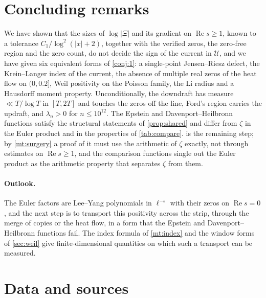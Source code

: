 \documentclass[11pt]{article}
\theoremstyle{definition}\newtheorem{definition}[theorem]{Definition}
\theoremstyle{remark}\newtheorem{remark}[theorem]{Remark}
\renewcommand{\Re}{\operatorname{Re}}\renewcommand{\Im}{\operatorname{Im}}
\begin{document}
\section{Concluding remarks}\label{sec:concl}
We have shown that the sizes of $\log|\Xi|$ and its gradient on $\Re s\ge1$, known to a tolerance $C_1/\log^2(|x|+2)$, together with the verified zeros, the zero-free region and the zero count, do not decide the sign of the current in $\mathcal U$, and we have given six equivalent forms of \cref{conj:1}: a single-point Jensen--Riesz defect, the Krein--Langer index of the current, the absence of multiple real zeros of the heat flow on $(0,0.2]$, Weil positivity on the Poisson family, the Li radius and a Hausdorff moment property. Unconditionally, the downdraft has measure $\ll T/\log T$ in $[T,2T]$ and touches the zeros off the line, Ford's region carries the updraft, and $\lambda_n>0$ for $n\le10^{12}$. The Epstein and Davenport--Heilbronn functions satisfy the structural statements of \cref{prop:shared} and differ from $\zeta$ in the Euler product and in the properties of \cref{tab:compare}.  is the remaining step; by \cref{mt:surgery} a proof of it must use the arithmetic of $\zeta$ exactly, not through estimates on $\Re s\ge1$, and the comparison functions single out the Euler product as the arithmetic property that separates $\zeta$ from them.

\paragraph{Outlook.} The Euler factors are Lee--Yang polynomials in $\ell^{-s}$ with their zeros on $\Re s=0$, and the next step is to transport this positivity across the strip, through the merge of copies or the heat flow, in a form that the Epstein and Davenport--Heilbronn functions fail. The index formula of \cref{mt:index} and the window forms of \cref{sec:weil} give finite-dimensional quantities on which such a transport can be measured.

\section{Data and sources}\label{sec:data}
\end{document}
